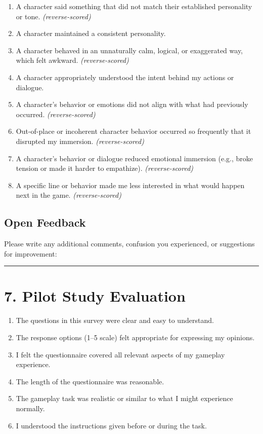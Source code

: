 \documentclass[12pt]{article}
\begin{document}
\begin{enumerate}[resume]
    \item A character said something that did not match their established personality or tone. \textit{(reverse-scored)}
    \item A character maintained a consistent personality.
    \item A character behaved in an unnaturally calm, logical, or exaggerated way, which felt awkward. \textit{(reverse-scored)}
    \item A character appropriately understood the intent behind my actions or dialogue.
    \item A character's behavior or emotions did not align with what had previously occurred. \textit{(reverse-scored)}
    \item Out-of-place or incoherent character behavior occurred so frequently that it disrupted my immersion. \textit{(reverse-scored)}
    \item A character's behavior or dialogue reduced emotional immersion (e.g., broke tension or made it harder to empathize). \textit{(reverse-scored)}
    \item A specific line or behavior made me less interested in what would happen next in the game. \textit{(reverse-scored)}
\end{enumerate}

\subsection*{Open Feedback}

Please write any additional comments, confusion you experienced, or suggestions for improvement:

\vspace{1.5cm}
\noindent\rule{\textwidth}{0.4pt}

\section*{7. Pilot Study Evaluation}

\begin{enumerate}[resume]
  \item The questions in this survey were clear and easy to understand.
  \item The response options (1–5 scale) felt appropriate for expressing my opinions.
  \item I felt the questionnaire covered all relevant aspects of my gameplay experience.
  \item The length of the questionnaire was reasonable.
  \item The gameplay task was realistic or similar to what I might experience normally.
  \item I understood the instructions given before or during the task.
\end{enumerate}
\end{document}
